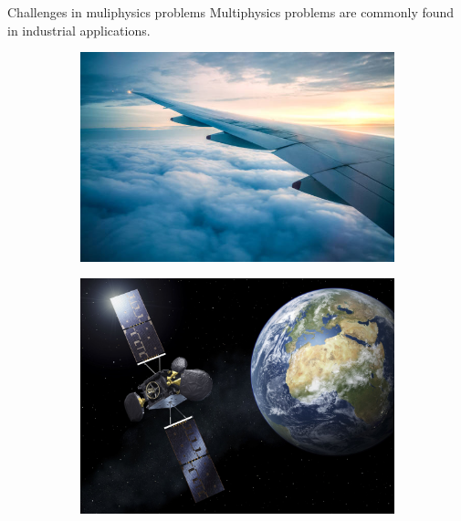 \documentclass[aspectratio=169]{beamer}
\begin{document}
\begin{frame}{Challenges in muliphysics problems}
	Multiphysics problems are commonly found in industrial applications.
	\begin{figure}[t]
		\begin{subfigure}[t]{0.34\textwidth}
			\includegraphics[width=\columnwidth]{wing.jpg}\\
		\end{subfigure}\hfill
		\begin{subfigure}[t]{0.3\textwidth}
			\includegraphics[width=\columnwidth]{esa_satellite.jpg}\\
		\end{subfigure}\hfill
		\begin{subfigure}[t]{0.26\textwidth}

\end{subfigure}
\end{figure}
\end{frame}
\end{document}
